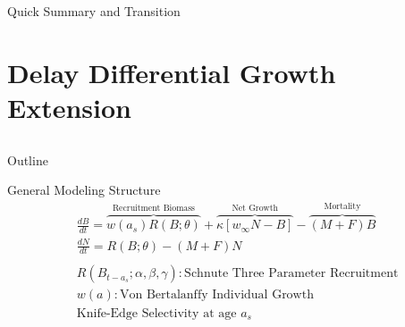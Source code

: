 \documentclass[ xcolor = pdftex, dvipsnames, table ]{beamer}
\begin{document}
\begin{frame}{}
\color{red}Quick Summary and Transition
\end{frame}

%
\section{Delay Differential Growth Extension}
\subsection{}
\begin{frame}{Outline}
\end{frame}

%
\begin{frame}{General Modeling Structure}
\begin{align*}%
&\frac{dB}{dt} = \overbrace{w(a_s)R(B;\theta)}^\text{Recruitment Biomass} + \overbrace{\kappa \left[w_\infty N-B\right]}^\text{Net Growth} - \overbrace{(M+F)B}^\text{Mortality} \\%
&\frac{dN}{dt} = R(B;\theta) - (M+F)N \\%
&~\\
&R(B_{t-a_s}; \alpha, \beta, \gamma): \text{Schnute Three Parameter Recruitment}\\
&w(a) : \text{Von Bertalanffy Individual Growth}\\
&\text{Knife-Edge Selectivity at age $a_s$}\\
\end{align*}
\end{frame}
\end{document}
